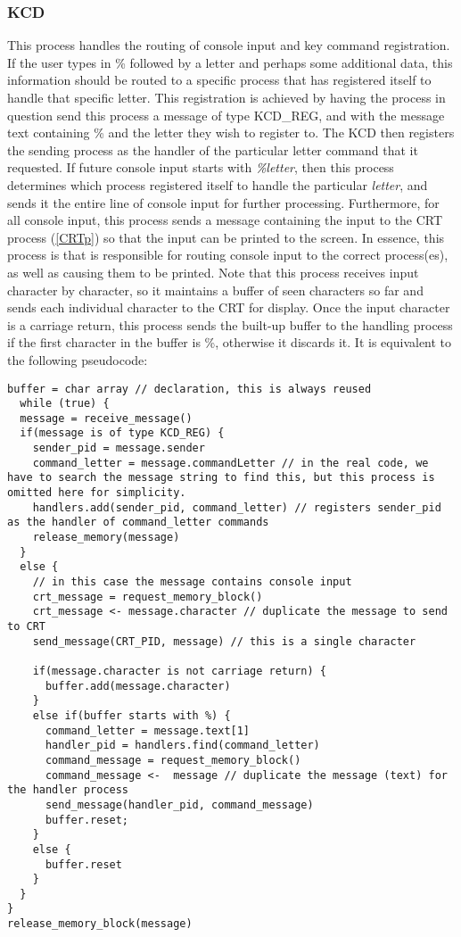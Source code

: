 \documentclass[12pt]{article}
\begin{document}
\subsubsection{KCD} \label{KCDp}
This process handles the routing of console input and key command registration. If the user types in \% followed by a letter and perhaps some additional data, this information should be routed to a specific process that has registered itself to handle that specific letter. This registration is achieved by having the process in question send this process a message of type KCD\_REG, and with the message text containing \% and the letter they wish to register to. The KCD then registers the sending process as the handler of the particular letter command that it requested. If future console input starts with \textit{\%letter}, then this process determines which process registered itself to handle the particular \textit{letter}, and sends it the entire line of console input for further processing. Furthermore, for all console input, this process sends a message containing the input to the CRT process (\ref{CRTp}) so that the input can be printed to the screen. In essence, this process is  that is responsible for routing console input to the correct process(es), as well as causing them to be printed. Note that this process receives input character by character, so it maintains a buffer of seen characters so far and sends each individual character to the CRT for display. Once the input character is a carriage return, this process sends the built-up buffer to the handling process if the first character in the buffer is \%, otherwise it discards it. It is equivalent to the following pseudocode:
\begin{lstlisting}[breaklines=true]
buffer = char array // declaration, this is always reused
  while (true) {
  message = receive_message()
  if(message is of type KCD_REG) {
    sender_pid = message.sender
    command_letter = message.commandLetter // in the real code, we have to search the message string to find this, but this process is omitted here for simplicity.
    handlers.add(sender_pid, command_letter) // registers sender_pid as the handler of command_letter commands
    release_memory(message)
  }
  else {
    // in this case the message contains console input
    crt_message = request_memory_block()
    crt_message <- message.character // duplicate the message to send to CRT
    send_message(CRT_PID, message) // this is a single character

    if(message.character is not carriage return) {
      buffer.add(message.character)
    }
    else if(buffer starts with %) {
      command_letter = message.text[1]
      handler_pid = handlers.find(command_letter)
      command_message = request_memory_block()
      command_message <-  message // duplicate the message (text) for the handler process
      send_message(handler_pid, command_message)
      buffer.reset;
    }
    else {
      buffer.reset
    }
  }
}
release_memory_block(message)
\end{lstlisting}
\end{document}

